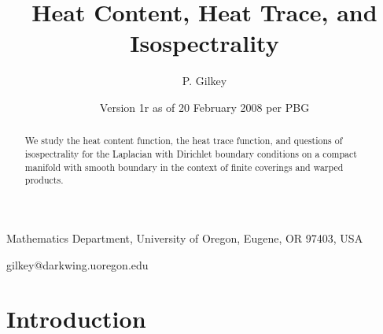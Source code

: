 \documentclass{amsart}
\begin{document}
\date{Version 1r as of 20 February 2008 per PBG}
\newtheorem{theorem}{Theorem}[section]
\newtheorem{lemma}[theorem]{Lemma}
\newtheorem{remark}[theorem]{Remark}
\newtheorem{question}[theorem]{Question}

\makeatletter
  
 \makeatother

\title[Heat Content and Isospectrality]
{Heat Content, Heat Trace, and Isospectrality}
\author{P. Gilkey}
\begin{address}{Mathematics Department, University of Oregon, Eugene, OR 97403, USA}\end{address}
\begin{email}{gilkey@darkwing.uoregon.edu}\end{email}
\begin{abstract} We study the heat content function, the heat trace function, and questions of
isospectrality for the Laplacian with Dirichlet boundary conditions on a compact manifold with smooth
boundary in the context of finite coverings and warped products.
\end{abstract}
\maketitle
\section{Introduction}
\end{document}
